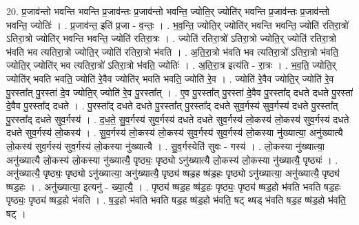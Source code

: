 \documentclass[17pt]{extarticle}
\begin{document}
20. प्र॒जाव॑न्तो भवन्ति भवन्ति प्र॒जाव॑न्तः प्र॒जाव॑न्तो भवन्ति॒ ज्योति॒र् ज्योति॑र् भवन्ति प्र॒जाव॑न्तः प्र॒जाव॑न्तो भवन्ति॒ ज्योतिः॑ । . प्र॒जाव॑न्त॒ इति॑ प्र॒जा - व॒न्तः॒ । . भ॒व॒न्ति॒ ज्योति॒र् ज्योति॑र् भवन्ति भवन्ति॒ ज्योति॑ रतिरा॒त्रो॑ ऽतिरा॒त्रो ज्योति॑र् भवन्ति भवन्ति॒ ज्योति॑ रतिरा॒त्रः । . ज्योति॑ रतिरा॒त्रो॑ ऽतिरा॒त्रो ज्योति॒र् ज्योति॑ रतिरा॒त्रो भ॑वति भव त्यतिरा॒त्रो ज्योति॒र् ज्योति॑ रतिरा॒त्रो भ॑वति । . अ॒ति॒रा॒त्रो भ॑वति भव त्यतिरा॒त्रो॑ ऽतिरा॒त्रो भ॑वति॒ ज्योति॒र् ज्योति॑र् भव त्यतिरा॒त्रो॑ ऽतिरा॒त्रो भ॑वति॒ ज्योतिः॑ । . अ॒ति॒रा॒त्र इत्य॑ति - रा॒त्रः । . भ॒व॒ति॒ ज्योति॒र् ज्योति॑र् भवति भवति॒ ज्योति॑ रे॒वैव ज्योति॑र् भवति भवति॒ ज्योति॑ रे॒व । . ज्योति॑ रे॒वैव ज्योति॒र् ज्योति॑ रे॒व पु॒रस्ता᳚त् पु॒रस्ता॑ दे॒व ज्योति॒र् ज्योति॑ रे॒व पु॒रस्ता᳚त् । . ए॒व पु॒रस्ता᳚त् पु॒रस्ता॑ दे॒वैव पु॒रस्ता᳚द् दधते दधते पु॒रस्ता॑ दे॒वैव पु॒रस्ता᳚द् दधते । . पु॒रस्ता᳚द् दधते दधते पु॒रस्ता᳚त् पु॒रस्ता᳚द् दधते सुव॒र्गस्य॑ सुव॒र्गस्य॑ दधते पु॒रस्ता᳚त् पु॒रस्ता᳚द् दधते सुव॒र्गस्य॑ । . द॒ध॒ते॒ सु॒व॒र्गस्य॑ सुव॒र्गस्य॑ दधते दधते सुव॒र्गस्य॑ लो॒कस्य॑ लो॒कस्य॑ सुव॒र्गस्य॑ दधते दधते सुव॒र्गस्य॑ लो॒कस्य॑ । . सु॒व॒र्गस्य॑ लो॒कस्य॑ लो॒कस्य॑ सुव॒र्गस्य॑ सुव॒र्गस्य॑ लो॒कस्या नु॑ख्यात्या॒ अनु॑ख्यात्यै लो॒कस्य॑ सुव॒र्गस्य॑ सुव॒र्गस्य॑ लो॒कस्या नु॑ख्यात्यै । . सु॒व॒र्गस्येति॑ सुवः - गस्य॑ । . लो॒कस्या नु॑ख्यात्या॒ अनु॑ख्यात्यै लो॒कस्य॑ लो॒कस्या नु॑ख्यात्यै॒ पृष्ठ्यः॒ पृष्ठ्यो ऽनु॑ख्यात्यै लो॒कस्य॑ लो॒कस्या नु॑ख्यात्यै॒ पृष्ठ्यः॑ । . अनु॑ख्यात्यै॒ पृष्ठ्यः॒ पृष्ठ्यो ऽनु॑ख्यात्या॒ अनु॑ख्यात्यै॒ पृष्ठ्य॑ ष्षड॒ह ष्ष॑ड॒हः पृष्ठ्यो ऽनु॑ख्यात्या॒ अनु॑ख्यात्यै॒ पृष्ठ्य॑ ष्षड॒हः । . अनु॑ख्यात्या॒ इत्यनु॑ - ख्या॒त्यै॒ । . पृष्ठ्य॑ ष्षड॒ह ष्ष॑ड॒हः पृष्ठ्यः॒ पृष्ठ्य॑ ष्षड॒हो भ॑वति भवति षड॒हः पृष्ठ्यः॒ पृष्ठ्य॑ ष्षड॒हो भ॑वति । . ष॒ड॒हो भ॑वति भवति षड॒ह ष्ष॑ड॒हो भ॑वति॒ षट् थ्षड् भ॑वति षड॒ह ष्ष॑ड॒हो भ॑वति॒ षट् । \newline
\end{document}
